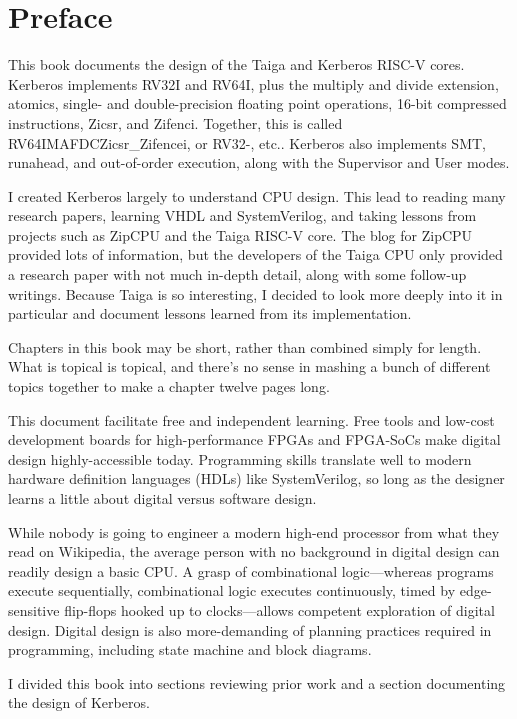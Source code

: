 \chapter*{Preface}
This book documents the design of the Taiga and Kerberos RISC-V cores.  Kerberos implements RV32I and RV64I, plus the multiply and divide extension, atomics, single- and double-precision floating point operations, 16-bit compressed instructions, Zicsr, and Zifenci.  Together, this is called RV64IMAFDCZicsr\_Zifencei, or RV32-, etc..  Kerberos also implements SMT, runahead, and out-of-order execution, along with the Supervisor and User modes.

I created Kerberos largely to understand CPU design.  This lead to reading many research papers, learning VHDL and SystemVerilog, and taking lessons from projects such as ZipCPU and the Taiga RISC-V core.  The blog for ZipCPU provided lots of information, but the developers of the Taiga CPU only provided a research paper with not much in-depth detail, along with some follow-up writings.  Because Taiga is so interesting, I decided to look more deeply into it in particular and document lessons learned from its implementation.

Chapters in this book may be short, rather than combined simply for length.  What is topical is topical, and there's no sense in mashing a bunch of different topics together to make a chapter twelve pages long.

This document facilitate free and independent learning.  Free tools and low-cost development boards for high-performance FPGAs and FPGA-SoCs make digital design highly-accessible today.  Programming skills translate well to modern hardware definition languages (HDLs) like SystemVerilog, so long as the designer learns a little about digital versus software design.

While nobody is going to engineer a modern high-end processor from what they read on Wikipedia, the average person with no background in digital design can readily design a basic CPU.  A grasp of combinational logic—whereas programs execute sequentially, combinational logic executes continuously, timed by edge-sensitive flip-flops hooked up to clocks—allows competent exploration of digital design.  Digital design is also more-demanding of planning practices required in programming, including state machine and block diagrams.

I divided this book into sections reviewing prior work and a section documenting the design of Kerberos.